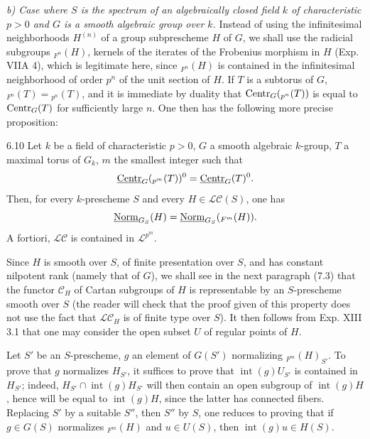 \par\noindent\emph{b) Case where $S$ is the spectrum of an algebraically closed field $k$ of characteristic $p>0$ and $G$ is a smooth algebraic group over $k$.}
Instead of using the infinitesimal neighborhoods $H^{(n)}$ of a group subprescheme $H$ of $G$, we shall use the radicial subgroups ${}_{F^n}(H)$, kernels of the iterates of the Frobenius morphism in $H$ (Exp. VIIA 4), which is legitimate here, since ${}_{F^n}(H)$ is contained in the infinitesimal neighborhood of order $p^n$ of the unit section of $H$. If $T$ is a subtorus of $G$, ${}_{F^n}(T)={}_{p^n}(T)$, and it is immediate by duality that $\operatorname{Centr}_G({}_{p^n}(T))$ is equal to $\operatorname{Centr}_G(T)$ for sufficiently large $n$. One then has the following more precise proposition:
\begin{proposition}{6.10}\label{XV.6.10}
Let $k$ be a field of characteristic $p>0$, $G$ a smooth algebraic $k$-group, $T$ a maximal torus of $G_k$, $m$ the smallest integer such that
\[
\underline{\mathrm{Centr}}_G({}_{p^m}(T))^0=\underline{\mathrm{Centr}}_G(T)^0.
\]
Then, for every $k$-prescheme $S$ and every $H\in\mathscr{LC}(S)$, one has
\[
\underline{\mathrm{Norm}}_{G_S}(H)=\underline{\mathrm{Norm}}_{G_S}({}_{F^m}(H)).
\]
A fortiori, $\mathscr{LC}$ is contained in $\mathscr L^{p^m}$.
\end{proposition}
Since $H$ is smooth over $S$, of finite presentation over $S$, and has constant nilpotent rank (namely that of $G$), we shall see in the next paragraph (7.3) that the functor $\mathscr C_H$ of Cartan subgroups of $H$ is representable by an $S$-prescheme smooth over $S$ (the reader will check that the proof given of this property does not use the fact that $\mathscr{LC}_H$ is of finite type over $S$). It then follows from Exp. XIII 3.1 that one may consider the open subset $U$ of regular points of $H$.

Let $S'$ be an $S$-prescheme, $g$ an element of $G(S')$ normalizing ${}_{F^m}(H)_{S'}$. To prove that $g$ normalizes $H_{S'}$, it suffices to prove that $\operatorname{int}(g)U_{S'}$ is contained in $H_{S'}$; indeed, $H_{S'}\cap\operatorname{int}(g)H_{S'}$ will then contain an open subgroup of $\operatorname{int}(g)H$, hence will be equal to $\operatorname{int}(g)H$, since the latter has connected fibers. Replacing $S'$ by a suitable $S''$, then $S''$ by $S$, one reduces to proving that if $g\in G(S)$ normalizes ${}_{F^m}(H)$ and $u\in U(S)$, then $\operatorname{int}(g)u\in H(S)$.

